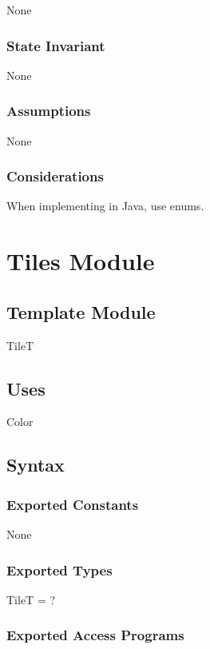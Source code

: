 \documentclass[12pt]{article}
\begin{document}
None

\subsubsection* {State Invariant}

None

\subsubsection* {Assumptions}

None

\subsubsection* {Considerations}

When implementing in Java, use enums.

\newpage

\section* {Tiles Module}

\subsection*{Template Module}

TileT

\subsection* {Uses}

Color

\subsection* {Syntax}

\subsubsection* {Exported Constants}

None

\subsubsection* {Exported Types}

TileT = ?

\subsubsection* {Exported Access Programs}
\end{document}
